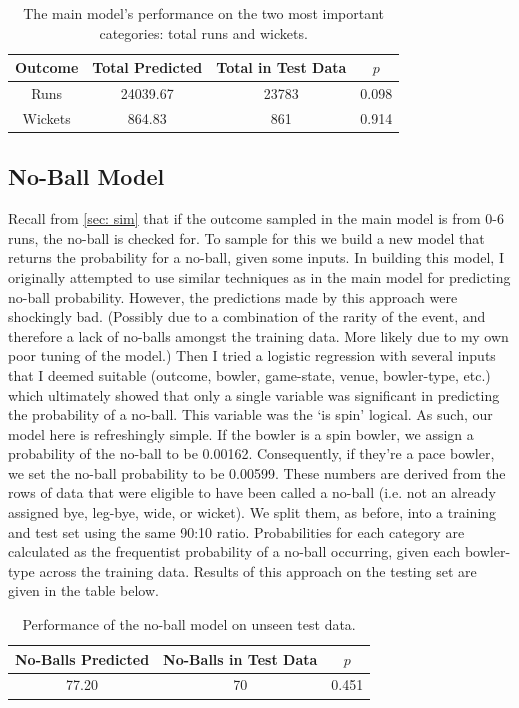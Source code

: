 \begin{table}[h]
\vspace{0.5em}
\centering
\begin{tabular} {c c c c} \toprule
    {Outcome} & {Total Predicted} & {Total in Test Data} & {$p$} \\ \midrule
     Runs & 24039.67 & 23783 & 0.098 \\
     Wickets & 864.83 & 861 & 0.914 \\ \bottomrule
\end{tabular}
\caption{The main model's performance on the two most important categories: total runs and wickets.}
\label{table: main model2}
\end{table}

\subsection{No-Ball Model}

Recall from \cref{sec: sim} that if the outcome sampled in the main model is from 0-6 runs, the no-ball is checked for. To sample for this we build a new model that returns the probability for a no-ball, given some inputs. In building this model, I originally attempted to use similar techniques as in the main model for predicting no-ball probability. However, the predictions made by this approach were shockingly bad. (Possibly due to a combination of the rarity of the event, and therefore a lack of no-balls amongst the training data. More likely due to my own poor tuning of the model.) Then I tried a logistic regression with several inputs that I deemed suitable (outcome, bowler, game-state, venue, bowler-type, etc.) which ultimately showed that only a single variable was significant in predicting the probability of a no-ball. This variable was the `is spin' logical. As such, our model here is refreshingly simple. If the bowler is a spin bowler, we assign a probability of the no-ball to be 0.00162. Consequently, if they're a pace bowler, we set the no-ball probability to be 0.00599. These numbers are derived from the rows of data that were eligible to have been called a no-ball (i.e. not an already assigned bye, leg-bye, wide, or wicket). We split them, as before, into a training and test set using the same 90:10 ratio. Probabilities for each category are calculated as the frequentist probability of a no-ball occurring, given each bowler-type across the training data. Results of this approach on the testing set are given in the table below.

\begin{table}[h]
\vspace{0.5em}
\centering
\begin{tabular} {c c c} \toprule
    {No-Balls Predicted} & {No-Balls in Test Data} & {$p$} \\ \midrule
     77.20 & 70 & 0.451 \\ \bottomrule
\end{tabular}
\caption{Performance of the no-ball model on unseen test data.}
\label{table: noball}
\end{table}

